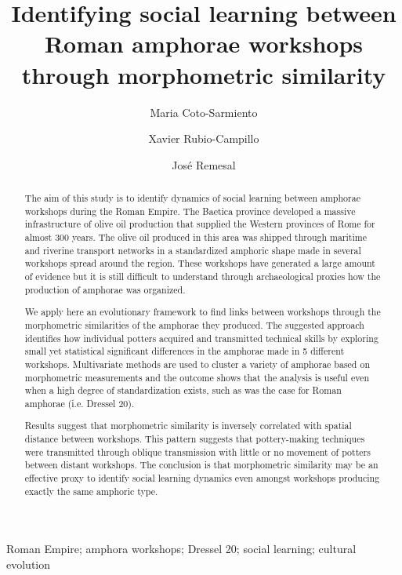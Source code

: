 \documentclass[review]{elsarticle}
\begin{document}
\begin{frontmatter}

\title{Identifying social learning between Roman amphorae workshops through morphometric similarity}


\author[bscadress,ceipacadress]{Maria Coto-Sarmiento}


\author[edadress]{Xavier Rubio-Campillo}
\author[ceipacadress]{Jos\'e Remesal}


\address[bscadress]{Barcelona Supercomputing Center (BSC), Jordi Girona 29, Office 3A, Nexus II Building, 08034, Barcelona, Spain}
\address[edadress]{School of History, Classic \& Archaeology, Room OOM.33, William Robertson Wing, Old Medical School, Teviot Place, University of Edinburgh, UK}
\address[ceipacadress]{CEIPAC, Department of Prehistory and Archaeology, Montalegre, 6-8, 08001, University of Barcelona, Barcelona, Spain}

\begin{abstract}

The aim of this study is to identify dynamics of social learning between amphorae workshops during the Roman Empire. The Baetica province developed a massive infrastructure of olive oil production that supplied the Western provinces of Rome for almost 300 years. The olive oil produced in this area was shipped through maritime and riverine transport networks in a standardized amphoric shape made in several workshops spread around the region. These workshops have generated a large amount of evidence but it is still difficult to understand through archaeological proxies how the production of amphorae was organized.

We apply here an evolutionary framework to find links between workshops through the morphometric similarities of the amphorae they produced. The suggested approach identifies how individual potters acquired and transmitted technical skills by exploring small yet statistical significant differences in the amphorae made in 5 different workshops. Multivariate methods are used to cluster a variety of amphorae based on morphometric measurements and the outcome shows that the analysis is useful even when a high degree of standardization exists, such as was the case for Roman amphorae (i.e. Dressel 20).

Results suggest that morphometric similarity is inversely correlated with spatial distance between workshops. This pattern suggests that pottery-making techniques were transmitted through oblique transmission with little or no movement of potters between distant workshops. The conclusion is that morphometric similarity may be an effective proxy to identify social learning dynamics even amongst workshops producing exactly the same amphoric type. 

\end{abstract}


\begin{keyword}
Roman Empire; amphora workshops; Dressel 20; social learning; cultural evolution
\end{keyword}

\end{frontmatter}
\end{document}
